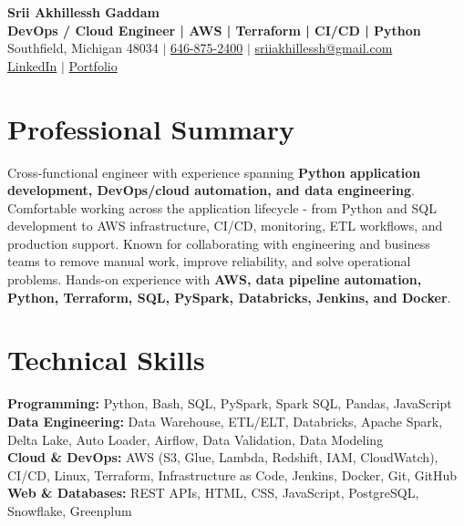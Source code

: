 \documentclass[letterpaper,10pt]{article}
\begin{document}
\fontsize{9.35pt}{10.45pt}\selectfont

\begin{center}
    {\LARGE \textbf{Srii Akhillessh Gaddam}} \\[-1pt]
    \textbf{DevOps / Cloud Engineer | AWS | Terraform | CI/CD | Python} \\[2pt]
    Southfield, Michigan 48034 $|$
    \href{tel:6468752400}{646-875-2400} $|$
    \href{mailto:sriiakhillessh@gmail.com}{sriiakhillessh@gmail.com} \\[1pt]
    \href{https://www.linkedin.com/in/srii-akhiilessh-gaddam-b48668191/}{LinkedIn} $|$
    \href{https://sriiakhillesshg.github.io/portfolio/}{Portfolio}
\end{center}
\vspace{-8pt}

\section{Professional Summary}
\small{Cross-functional engineer with experience spanning \textbf{Python application development, DevOps/cloud automation, and data engineering}. Comfortable working across the application lifecycle - from Python and SQL development to AWS infrastructure, CI/CD, monitoring, ETL workflows, and production support. Known for collaborating with engineering and business teams to remove manual work, improve reliability, and solve operational problems. Hands-on experience with \textbf{AWS, data pipeline automation, Python, Terraform, SQL, PySpark, Databricks, Jenkins, and Docker}.}

\section{Technical Skills}
\small{
\textbf{Programming:} Python, Bash, SQL, PySpark, Spark SQL, Pandas, JavaScript \\
\textbf{Data Engineering:} Data Warehouse, ETL/ELT, Databricks, Apache Spark, Delta Lake, Auto Loader, Airflow, Data Validation, Data Modeling \\
\textbf{Cloud \& DevOps:} AWS (S3, Glue, Lambda, Redshift, IAM, CloudWatch), CI/CD, Linux, Terraform, Infrastructure as Code, Jenkins, Docker, Git, GitHub \\
\textbf{Web \& Databases:} REST APIs, HTML, CSS, JavaScript, PostgreSQL, Snowflake, Greenplum
}
\end{document}

